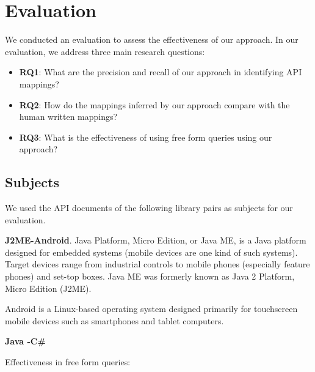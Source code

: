 \section{Evaluation}
\label{sec:evaluation}

We conducted an evaluation to assess the effectiveness of our approach. In our evaluation, we address three main research questions:

\begin{itemize}
	
\item\textbf{RQ1}: What are the precision and recall of our approach in identifying API mappings?

\item\textbf{RQ2}: How do the mappings inferred by our approach compare with the human written mappings?

\item\textbf{RQ3}: What is the effectiveness of using free form queries using our approach?

\end{itemize}

\subsection{Subjects}
\label{sub:subject}

We used the API documents of the following library pairs as subjects for our evaluation. 


\textbf{J2ME-Android}. Java Platform, Micro Edition, or Java ME, is a Java platform designed for embedded systems (mobile devices are one kind of such systems). Target devices range from industrial controls to mobile phones (especially feature phones) and set-top boxes. Java ME was formerly known as Java 2 Platform, Micro Edition (J2ME).

Android is a Linux-based operating system designed primarily for touchscreen mobile devices such as smartphones and tablet computers.

\textbf{Java -C\#}




Effectiveness in free form queries:

